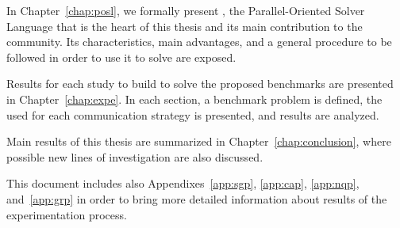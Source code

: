 
In Chapter~\ref{chap:posl}, we formally present \posl, the Parallel-Oriented Solver Language that is the heart of this thesis and its main contribution to the community. Its characteristics, main advantages, and a general procedure to be followed in order to use it to solve \CSPs{} are
exposed.

Results for each study to build \posl{} \comstrs{} to solve the proposed benchmarks are presented in Chapter~\ref{chap:expe}. In each section, a benchmark problem is defined, the used \soset{} for each communication strategy is presented, and results are analyzed. %

Main results of this thesis are summarized in Chapter~\ref{chap:conclusion}, where possible new lines of investigation are also discussed.

This document includes also Appendixes~\ref{app:sgp}, \ref{app:cap}, \ref{app:nqp}, and~\ref{app:grp} in order to bring more detailed information about results of the experimentation process.
